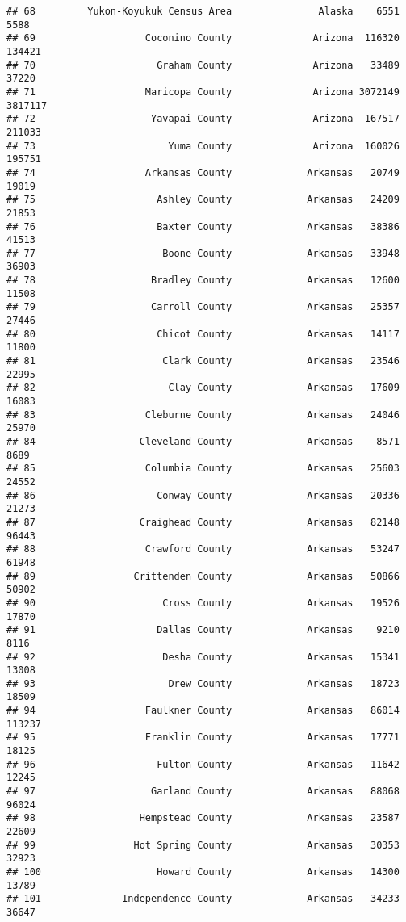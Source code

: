 \documentclass[
]{article}
\begin{document}
\begin{verbatim}
## 68         Yukon-Koyukuk Census Area               Alaska    6551    5588
## 69                   Coconino County              Arizona  116320  134421
## 70                     Graham County              Arizona   33489   37220
## 71                   Maricopa County              Arizona 3072149 3817117
## 72                    Yavapai County              Arizona  167517  211033
## 73                       Yuma County              Arizona  160026  195751
## 74                   Arkansas County             Arkansas   20749   19019
## 75                     Ashley County             Arkansas   24209   21853
## 76                     Baxter County             Arkansas   38386   41513
## 77                      Boone County             Arkansas   33948   36903
## 78                    Bradley County             Arkansas   12600   11508
## 79                    Carroll County             Arkansas   25357   27446
## 80                     Chicot County             Arkansas   14117   11800
## 81                      Clark County             Arkansas   23546   22995
## 82                       Clay County             Arkansas   17609   16083
## 83                   Cleburne County             Arkansas   24046   25970
## 84                  Cleveland County             Arkansas    8571    8689
## 85                   Columbia County             Arkansas   25603   24552
## 86                     Conway County             Arkansas   20336   21273
## 87                  Craighead County             Arkansas   82148   96443
## 88                   Crawford County             Arkansas   53247   61948
## 89                 Crittenden County             Arkansas   50866   50902
## 90                      Cross County             Arkansas   19526   17870
## 91                     Dallas County             Arkansas    9210    8116
## 92                      Desha County             Arkansas   15341   13008
## 93                       Drew County             Arkansas   18723   18509
## 94                   Faulkner County             Arkansas   86014  113237
## 95                   Franklin County             Arkansas   17771   18125
## 96                     Fulton County             Arkansas   11642   12245
## 97                    Garland County             Arkansas   88068   96024
## 98                  Hempstead County             Arkansas   23587   22609
## 99                 Hot Spring County             Arkansas   30353   32923
## 100                    Howard County             Arkansas   14300   13789
## 101              Independence County             Arkansas   34233   36647

\end{verbatim}
\end{document}

